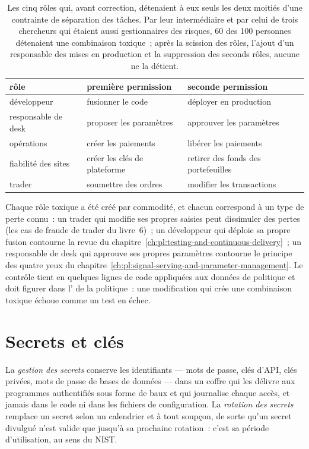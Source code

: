 \begin{table}[htbp]
\centering\small
\begin{tabular}{lll}
\toprule
rôle & première permission & seconde permission\\
\midrule
développeur & fusionner le code & déployer en production\\
responsable de desk & proposer les paramètres & approuver les paramètres\\
opérations & créer les paiements & libérer les paiements\\
fiabilité des sites & créer les clés de plateforme & retirer des fonds des portefeuilles\\
trader & soumettre des ordres & modifier les transactions\\
\bottomrule
\end{tabular}
\caption{Les cinq rôles qui, avant correction, détenaient à eux seuls les deux moitiés d'une contrainte de séparation des tâches. Par leur intermédiaire et par celui de
trois chercheurs qui étaient aussi gestionnaires des risques, 60 des 100 personnes détenaient une combinaison toxique~; après la scission des rôles, l'ajout d'un responsable
des mises en production et la suppression des seconds rôles, aucune ne la détient.}\label{tab:pl:security:toxic}
\end{table}

Chaque rôle toxique a été créé par commodité, et chacun correspond à un type de perte connu~: un trader qui modifie ses propres saisies peut dissimuler des pertes
(les cas de fraude de trader du livre~6)~; un développeur qui déploie sa propre fusion contourne la revue du chapitre~\ref{ch:pl:testing-and-continuous-delivery}~;
un responsable de desk qui approuve ses propres paramètres contourne le principe des quatre yeux du chapitre~\ref{ch:pl:signal-serving-and-parameter-management}. Le contrôle tient en
quelques lignes de code appliquées aux données de politique et doit figurer dans l' de la politique~: une modification qui crée une combinaison toxique échoue
comme un test en échec.

\section{Secrets et clés}

\begin{definition}\label{def:pl:security:secrets}
La \emph{gestion des secrets} conserve les identifiants --- mots de passe, clés d'API, clés privées, mots de passe de bases de données --- dans un
coffre qui les délivre aux programmes authentifiés sous forme de baux et qui journalise chaque accès, et jamais dans le code ni dans les fichiers de configuration. La
\emph{rotation des secrets} remplace un secret selon un calendrier et à tout soupçon, de sorte qu'un secret divulgué n'est valide que jusqu'à sa
prochaine rotation~: c'est sa période d'utilisation, au sens du NIST.
\end{definition}

